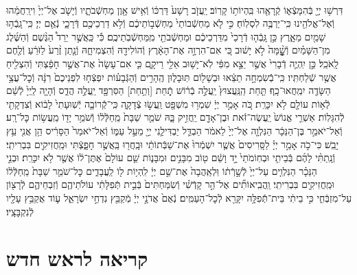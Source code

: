 \documentclass[twoside, openany, parskip=half, 11pt]{book}
\begin{document}
\begin{footnotesize}
\begin{multicols}{2}
\\
דִּרְשׁ֥וּ יְיָ֖ בְּֿהִמָּצְֿא֑וֹ קְֿרָאֻ֖הוּ בִּֽהְיוֹת֥וֹ קָרֽוֹב׃ יַֽעֲזֹ֤ב רָשָׁע֙ דַּרְכּ֔וֹ וְֿאִ֥ישׁ אָ֖וֶן מַחְשְֿׁבֹתָ֑יו וְֿיָשֹׁ֤ב אֶל־יְיָ֙ וִירַֽחֲמֵ֔הוּ וְֿאֶל־אֱלֹהֵ֖ינוּ כִּֽי־יַרְבֶּ֥ה לִסְלֽוֹחַ׃ כִּ֣י לֹ֤א מַחְשְֿׁבוֹתַי֙ מַחְשְֿׁב֣וֹתֵיכֶ֔ם וְֿלֹ֥א דַרְכֵיכֶ֖ם דְּֿרָכָ֑י נְֿאֻ֖ם יְיָ׃ כִּֽי־גָֽבְֿה֥וּ שָׁמַ֖יִם מֵאָ֑רֶץ כֵּ֣ן גָּֽבְֿה֤וּ דְֿרָכַי֙ מִדַּרְכֵיכֶ֔ם וּמַחְשְֿׁבֹתַ֖י מִֽמַּחְשְֿׁבֹֽתֵיכֶֽם׃ כִּ֡י כַּֽאֲשֶׁ֣ר יֵרֵד֩ הַגֶּ֨שֶׁם וְֿהַשֶּׁ֜לֶג מִן־הַשָּׁמַ֗יִם וְֿשׇׇׇׇׇׇׇׇָׁ֨מָּה֙ לֹ֣א יָשׁ֔וּב כִּ֚י אִם־הִרְוָ֣ה אֶת־הָאָ֔רֶץ וְֿהוֹלִידָ֖הּ וְֿהִצְמִיחָ֑הּ וְֿנָ֤תַן זֶ֨רַע֙ לַזֹּרֵ֔עַ וְֿלֶ֖חֶם לָֽאֹכֵֽל׃ כֵּ֣ן יִֽהְיֶ֤ה דְֿבָרִי֙ אֲשֶׁ֣ר יֵצֵ֣א מִפִּ֔י לֹֽא־יָשׁ֥וּב אֵלַ֖י רֵיקָ֑ם כִּ֤י אִם־עָשָׂה֙ אֶת־אֲשֶׁ֣ר חָפַ֔צְתִּי וְֿהִצְלִ֖יחַ אֲשֶׁ֥ר שְֿׁלַחְתִּֽיו׃ כִּֽי־בְֿֿשִׂמְחָ֣ה תֵצֵ֔אוּ וּבְשָׁל֖וֹם תּֽוּבָל֑וּן הֶֽהָרִ֣ים וְֿהַגְּֿבָע֗וֹת יִפְצְֿח֤וּ לִפְנֵיכֶם֙ רִנָּ֔ה וְֿכׇל־עֲצֵ֥י הַשָּׂדֶ֖ה יִמְֽחֲאוּ־כָֽף׃ תַּ֤חַת הַֽנַּֽעֲצוּץ֙ יַֽעֲלֶ֣ה בְֿר֔וֹשׁ תְַֿ֥חַת [וְתַ֥חַת] הַסִּרְפָּ֖ד יַֽעֲלֶ֣ה הֲדַ֑ס וְֿהָיָ֤ה לַֽיְיָ֙ לְֿשֵׁ֔ם לְֿא֥וֹת עוֹלָ֖ם לֹ֥א יִכָּרֵֽת׃ כֹּ֚ה אָמַ֣ר יְיָ֔ שִׁמְר֥וּ מִשְׁפָּ֖ט וַֽעֲשׂ֣וּ צְֿדָקָ֑ה כִּֽי־קְֿֿרוֹבָ֤ה יְֿשֽׁוּעָתִי֙ לָב֔וֹא וְֿצִדְקָתִ֖י לְֿהִגָּלֽוֹת׃ אַשְׁרֵ֤י אֱנוֹשׁ֙ יַֽעֲשֶׂה־זֹּ֔את וּבֶן־אָדָ֖ם יַֽחֲזִ֣יק בָּ֑הּ שֹׁמֵ֤ר שַׁבָּת֙ מֵֽחַלְּֿל֔וֹ וְֿשֹׁמֵ֥ר יָד֖וֹ מֵֽעֲשׂ֥וֹת כׇּל־רָֽע׃ וְֿאַל־יֹאמַ֣ר בֶּן־הַנֵּכָ֔ר הַנִּלְוָ֤ה אֶל־יְיָ֙ לֵאמֹ֔ר הַבְדֵּ֧ל יַבְדִּילַ֛נִי יְיָ֖ מֵעַ֣ל עַמּ֑וֹ וְֿאַל־יֹאמַר֙ הַסָּרִ֔יס הֵ֥ן אֲנִ֖י עֵ֥ץ יָבֵֽשׁ׃ כִּי־כֹ֣ה אָמַ֣ר יְיָ֗ לַסָּֽרִיסִים֙ אֲשֶׁ֤ר יִשְׁמְֿרוּ֙ אֶת־שַׁבְּֿתוֹתַ֔י וּבָֽחֲר֖וּ בַּֽאֲשֶׁ֣ר חָפָ֑צְֿתִּי וּמַֽחֲזִיקִ֖ים בִּבְרִיתִֽי׃ וְֿנָֽתַתִּ֨י לָהֶ֜ם בְּֿבֵיתִ֤י וּבְחֽוֹמֹתַי֙ יָ֣ד וָשֵׁ֔ם ט֖וֹב מִבָּנִ֣ים וּמִבָּנ֑וֹת שֵׁ֤ם עוֹלָם֙ אֶתֶּן־ל֔וֹ אֲשֶׁ֖ר לֹ֥א יִכָּרֵֽת׃ וּבְנֵ֣י הַנֵּכָ֗ר הַנִּלְוִ֤ים עַל־יְיָ֙ לְֿשָׁ֣רְֿת֔וֹ וּֽלְאַֽהֲבָה֙ אֶת־שֵׁ֣ם יְיָ֔ לִֽהְי֥וֹת ל֖וֹ לַֽעֲבָדִ֑ים כׇּל־שֹׁמֵ֤ר שַׁבָּת֙ מֵֽחַלְּֿל֔וֹ וּמַֽחֲזִיקִ֖ים בִּבְרִיתִֽי׃ וַֽהֲבִֽיאוֹתִ֞ים אֶל־הַ֣ר קָדְֿשִׁ֗י וְֿשִׂמַּחְתִּים֙ בְּֿבֵ֣ית תְּֿפִלָּתִ֔י עוֹלֹתֵיהֶ֧ם וְֿזִבְחֵיהֶ֛ם לְֿרָצ֖וֹן עַל־מִזְבְּֿחִ֑י כִּ֣י בֵיתִ֔י בֵּית־תְּֿֿפִלָּ֥ה יִקָּרֵ֖א לְֿכׇל־הָעַמִּֽים׃ נְֿאֻם֙ אֲדֹנָ֣י יְיָ֔ מְֿקַבֵּ֖ץ נִדְחֵ֣י יִשְׂרָאֵ֑ל ע֛וֹד אֲקַבֵּ֥ץ עָלָ֖יו לְֿנִקְבָּצָֽיו׃

\end{multicols}

\section[ראש חדש]{קריאה לראש חדש}



\end{footnotesize}
\end{document}
